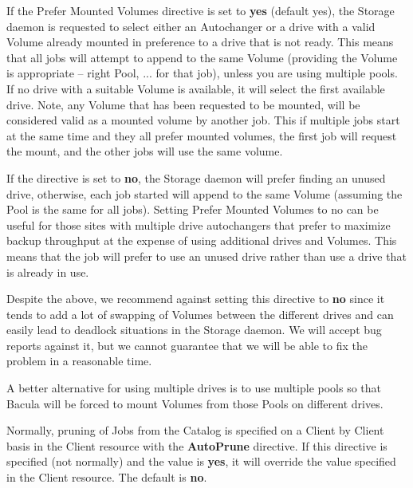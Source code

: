 \begin{description}
\label{PreferMountedVolumes}
\item [Prefer Mounted Volumes = \lt{}yes\vb{}no\gt{}]
   If the Prefer Mounted Volumes directive is set to {\bf yes} (default
   yes), the Storage daemon is requested to select either an Autochanger or
   a drive with a valid Volume already mounted in preference to a drive
   that is not ready.  This means that all jobs will attempt to append
   to the same Volume (providing the Volume is appropriate -- right Pool, 
   ... for that job), unless you are using multiple pools.
   If no drive with a suitable Volume is available, it
   will select the first available drive.  Note, any Volume that has
   been requested to be mounted, will be considered valid as a mounted
   volume by another job.  This if multiple jobs start at the same time
   and they all prefer mounted volumes, the first job will request the
   mount, and the other jobs will use the same volume.

   If the directive is set to {\bf no}, the Storage daemon will prefer
   finding an unused drive, otherwise, each job started will append to the
   same Volume (assuming the Pool is the same for all jobs).  Setting
   Prefer Mounted Volumes to no can be useful for those sites
   with multiple drive autochangers that prefer to maximize backup
   throughput at the expense of using additional drives and Volumes. 
   This means that the job will prefer to use an unused drive rather
   than use a drive that is already in use.

   Despite the above, we recommend against setting this directive to
   {\bf no} since
   it tends to add a lot of swapping of Volumes between the different
   drives and can easily lead to deadlock situations in the Storage
   daemon. We will accept bug reports against it, but we cannot guarantee
   that we will be able to fix the problem in a reasonable time.

   A better alternative for using multiple drives is to use multiple
   pools so that Bacula will be forced to mount Volumes from those Pools
   on different drives.

\item [Prune Jobs = \lt{}yes\vb{}no\gt{}]
   Normally, pruning of Jobs from the Catalog is specified on a Client by
   Client basis in the Client resource with the {\bf AutoPrune} directive.
   If this directive is specified (not normally) and the value is {\bf
   yes}, it will override the value specified in the Client resource.  The
   default is {\bf no}.



\end{description}
